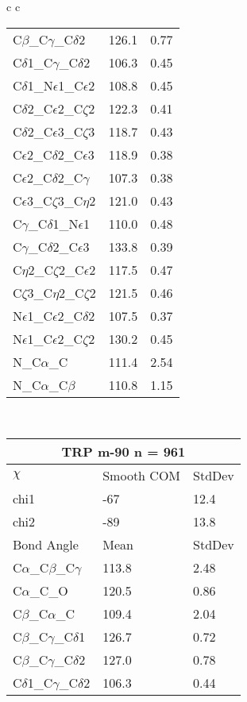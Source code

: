 \begin{longtable}{ c c }
\begin{tabular}{ l l l }
  C$\beta$\_C$\gamma$\_C$\delta$2 & 126.1 & 0.77\\
  C$\delta$1\_C$\gamma$\_C$\delta$2 & 106.3 & 0.45\\
  C$\delta$1\_N$\epsilon$1\_C$\epsilon$2 & 108.8 & 0.45\\
  C$\delta$2\_C$\epsilon$2\_C$\zeta$2 & 122.3 & 0.41\\
  C$\delta$2\_C$\epsilon$3\_C$\zeta$3 & 118.7 & 0.43\\
  C$\epsilon$2\_C$\delta$2\_C$\epsilon$3 & 118.9 & 0.38\\
  C$\epsilon$2\_C$\delta$2\_C$\gamma$ & 107.3 & 0.38\\
  C$\epsilon$3\_C$\zeta$3\_C$\eta$2 & 121.0 & 0.43\\
  C$\gamma$\_C$\delta$1\_N$\epsilon$1 & 110.0 & 0.48\\
  C$\gamma$\_C$\delta$2\_C$\epsilon$3 & 133.8 & 0.39\\
  C$\eta$2\_C$\zeta$2\_C$\epsilon$2 & 117.5 & 0.47\\
  C$\zeta$3\_C$\eta$2\_C$\zeta$2 & 121.5 & 0.46\\
  N$\epsilon$1\_C$\epsilon$2\_C$\delta$2 & 107.5 & 0.37\\
  N$\epsilon$1\_C$\epsilon$2\_C$\zeta$2 & 130.2 & 0.45\\
  N\_C$\alpha$\_C & 111.4 & 2.54\\
  N\_C$\alpha$\_C$\beta$ & 110.8 & 1.15\\
  \bottomrule
  \end{tabular}
  \\
  \begin{tabular}{ l l l }
  \toprule
  \multicolumn{3}{c}{TRP \textbf{m-90} n = 961} \\ \toprule
  $\chi$       & Smooth COM & StdDev \\ \midrule
  chi1 & -67 & 12.4 \\ 
  chi2 & -89 & 13.8 \\ \midrule
  Bond Angle   & Mean     & StdDev \\ \midrule
  C$\alpha$\_C$\beta$\_C$\gamma$ & 113.8 & 2.48\\
  C$\alpha$\_C\_O & 120.5 & 0.86\\
  C$\beta$\_C$\alpha$\_C & 109.4 & 2.04\\
  C$\beta$\_C$\gamma$\_C$\delta$1 & 126.7 & 0.72\\
  C$\beta$\_C$\gamma$\_C$\delta$2 & 127.0 & 0.78\\
  C$\delta$1\_C$\gamma$\_C$\delta$2 & 106.3 & 0.44\\

\end{tabular}
\end{longtable}
